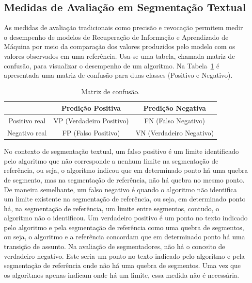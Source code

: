 \subsection{Medidas de Avaliação em Segmentação Textual}


% 


As medidas de avaliação tradicionais como precisão e revocação permitem medir o desempenho de modelos de Recuperação de Informação e Aprendizado de Máquina por meio da comparação dos valores produzidos pelo modelo com os valores observados em uma referência. 
Usa-se uma tabela, chamada matriz de confusão, para visualizar o desempenho de um algoritmo. Na Tabela~\ref{tab:matrizconfusao} é apresentada uma matriz de confusão para duas classes (Positivo e Negativo). 


\begin{table}[!h]
\centering

\begin{tabular}{|c|c|c|}
  \hline
				& Predição Positiva        & Predição Negativa        \\ \hline
  Positivo real & VP (Verdadeiro Positivo) & FN (Falso Negativo)      \\ \hline
  Negativo real & FP (Falso Positivo)      & VN (Verdadeiro Negativo) \\ \hline

\end{tabular}

\caption{Matriz de confusão.}
\label{tab:matrizconfusao}

\end{table}



No contexto de segmentação textual, um falso positivo é um limite identificado pelo algoritmo que não corresponde a nenhum limite na segmentação de referência, ou seja, o algoritmo indicou que em determinado ponto há uma quebra de segmento, mas na segmentação de referência, não há quebra no mesmo ponto. De maneira semelhante, um falso negativo é quando o algoritmo não identifica um limite existente na segmentação de referência, ou seja, em determinado ponto há, na segmentação de referência, um limite entre segmentos, contudo, o algoritmo não o identificou.  Um verdadeiro positivo é um ponto no texto indicado pelo algoritmo e pela segmentação de referência como uma quebra de segmentos, ou seja, o algoritmo e a referência concordam que em determinado ponto há uma transição de assunto.  Na avaliação de segmentadores, não há o conceito de verdadeiro negativo. Este seria um ponto no texto indicado pelo algoritmo e pela segmentação de referência onde não há uma quebra de segmentos. Uma vez que os algoritmos apenas indicam onde há um limite, essa medida não é necessária. %


